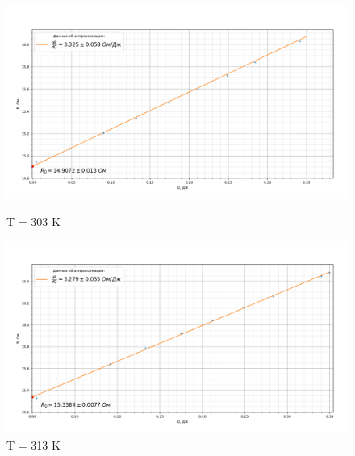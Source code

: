 \documentclass[a4paper, 12pt]{article}%
\begin{document}
	\begin{figure}[H]
		\begin{center}
			\begin{minipage}[h]{0.48\linewidth}
				\includegraphics[width=1\linewidth]{30_grad}
				\caption{T = 303 K} 
			\end{minipage}
			\hfill
			\begin{minipage}[h]{0.48\linewidth}
				\includegraphics[width=1\linewidth]{40_grad}
				\caption{T = 313 K}
				

\end{minipage}
\end{center}
\end{figure}
\end{document}
